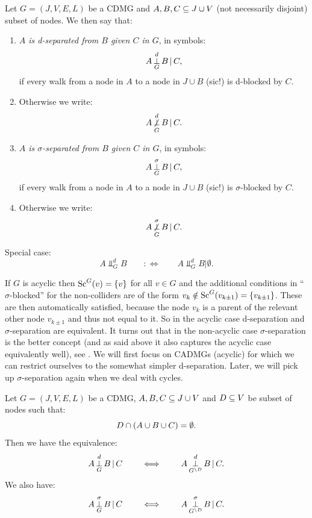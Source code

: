 \begin{Def}
    Let $G=(J,V,E,L)$ be a CDMG and $A,B,C \subseteq J \cup V$ (not necessarily disjoint) subset of nodes.
    We then say that:
    \begin{enumerate}
        \item 
    \emph{$A$ is d-separated from $B$ given $C$ in $G$}, in symbols:
    \[ A \operatorname*{\perp}^d_G B \operatorname*{|} C, \]
    if every walk from a node in $A$ to a node in $J \cup B$ (sic!) is d-blocked by $C$. 
\item[] Otherwise we write:
    \[ A \operatorname*{\not\perp}^d_G B \operatorname*{|} C.\]
\item       \emph{$A$ is $\sigma$-separated from $B$ given $C$ in $G$}, in symbols:
    \[ A \operatorname*{\perp}^\sigma_G B \operatorname*{|} C, \]
    if every walk from a node in $A$ to a node in $J \cup B$ (sic!) is $\sigma$-blocked by $C$. 
\item[] Otherwise we write:
    \[ A \operatorname*{\not\perp}^\sigma_G B \operatorname*{|} C.\]
    \end{enumerate}
    Special case:
    \[ A \Perp_G^d B \qquad :\iff \qquad A \Perp_G^d B | \emptyset.\]
\end{Def}


\begin{Rem}
    If $G$ is acyclic then $\mathrm{Sc}^G(v)=\{v\}$ for all $v \in G$ and the additional conditions in ``$\sigma$-blocked'' 
    for the non-colliders are of the form $v_k \notin \mathrm{Sc}^G(v_{k\pm 1})=\{v_{k\pm1}\}$.
    These are then automatically satisfied, because the node $v_k$ is a parent of 
    the relevant other node $v_{k \pm1}$ and thus not equal to it. 
    So in the acyclic case d-separation and $\sigma$-separation are equivalent.
    It turns out that in the non-acyclic case $\sigma$-separation is the better concept (and as said above it also captures the acyclic case equivalently well), see \cite{FM17,FM18,FM20}.
    We will first focus on CADMGs (acyclic) for which we can restrict ourselves to the somewhat simpler d-separation.
    Later, we will pick up $\sigma$-separation again when we deal with cycles.
\end{Rem}

\begin{Lem}\label{lem:stability_separation_marginalization}
        Let $G=(J,V,E,L)$ be a CDMG, $A,B,C \subseteq J \cup V$ and $D \subseteq V$ 
        be subset of nodes such that:
        \[ D \cap \left ( A \cup B \cup C\right ) = \emptyset.\]
        Then we have the equivalence:
        \[ A \operatorname*{\perp}^d_G B \operatorname*{|} C \qquad \iff \qquad  A \operatorname*{\perp}^d_{G^{\setminus D} }B \operatorname*{|} C. \]
        We also have:
        \[ A \operatorname*{\perp}^\sigma_G B \operatorname*{|} C \qquad \iff \qquad  A \operatorname*{\perp}^\sigma_{G^{\setminus D} }B \operatorname*{|} C. \]
\end{Lem}

